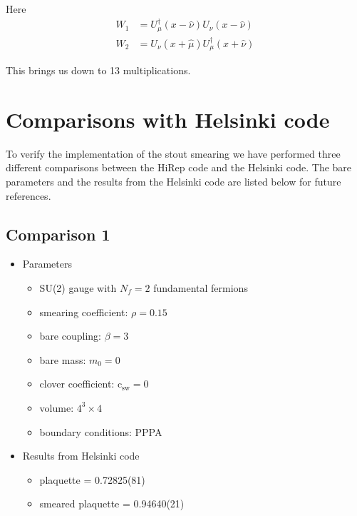 \documentclass[12pt]{article}
\newcommand{\csw}{\mathrm{c}_\mathrm{sw}}
\begin{document}
Here
\begin{align}
 W_1 &= U_\mu^\dagger(x-\hat{\nu})U_\nu(x-\hat{\nu}) \\
 W_2 &= U_\nu(x+\hat{\mu})U_\mu^\dagger(x+\hat{\nu})
\end{align}

This brings us down to 13 multiplications.

\newpage
\section*{Comparisons with Helsinki code}
To verify the implementation of the stout smearing we have performed three different comparisons between the HiRep code and the Helsinki code. The bare parameters and the results from the Helsinki code are listed below for future references.

\subsection*{Comparison 1}
\begin{itemize}
\item Parameters
\begin{itemize}
 \item SU(2) gauge with $N_f=2$ fundamental fermions
 \item smearing coefficient: $\rho=0.15$
 \item bare coupling: $\beta=3$
 \item bare mass: $m_0=0$
 \item clover coefficient: $\csw=0$
 \item volume: $4^3\times4$
 \item boundary conditions: PPPA
\end{itemize}
\item Results from Helsinki code
\begin{itemize}
 \item plaquette = 0.72825(81)
 \item smeared plaquette = 0.94640(21)
\end{itemize}
\end{itemize}

\newpage
\end{document}
